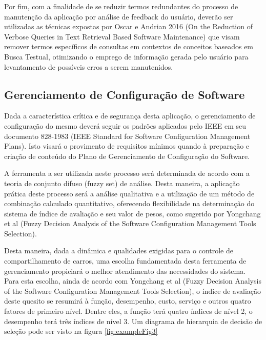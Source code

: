 \documentclass[12pt]{article}
\begin{document}
Por fim, com a finalidade de se reduzir termos redundantes do processo de manutenção da aplicação por análise de feedback do usuário, deverão ser utilizadas as técnicas expostas por Oscar e Andrian 2016  (On the Reduction of Verbose Queries in Text Retrieval Based Software Maintenance) que visam remover termos específicos de consultas em contextos de conceitos baseados em Busca Testual, otimizando o emprego de informação gerada pelo usuário para levantamento de possíveis erros a serem manutenidos.

\subsection{Gerenciamento de Configuração de Software}

Dada a característica crítica e de segurança desta aplicação, o gerenciamento de configuração do mesmo deverá seguir os padrões aplicados pelo IEEE em seu documento 828-1983 (IEEE Standard for Software Configuration Management Plans). Isto visará o provimento de requisitos mínimos quando à preparação e criação de conteúdo do Plano de Gerenciamento de Configuração do Software.

A ferramenta a ser utilizada neste processo será determinada de acordo com a teoria de conjunto difuso (fuzzy set) de análise. Desta maneira, a aplicação prática deste processo será a análise qualitativa e a utilização de um método de combinação calculado quantitativo, oferecendo flexibilidade na determinação do sistema de índice de avaliação e seu valor de pesos, como sugerido por Yongchang et al (Fuzzy Decision Analysis of the Software Configuration Management Tools Selection).

Desta maneira, dada a dinâmica e qualidades exigidas para o controle de compartilhamento de carros, uma escolha fundamentada desta ferramenta de gerenciamento propiciará o melhor atendimento das necessidades do sistema. Para esta escolha, ainda de acordo com Yongchang et al (Fuzzy Decision Analysis of the Software Configuration Management Tools Selection), o índice de avaliação deste quesito se resumirá à função, desempenho, custo, serviço e outros quatro fatores de primeiro nível. Dentre eles, a função terá quatro índices de nível 2, o desempenho terá três índices de nível 3. Um diagrama de hierarquia de decisão de seleção pode ser visto na figura \ref{fig:exampleFig3}
\end{document}
